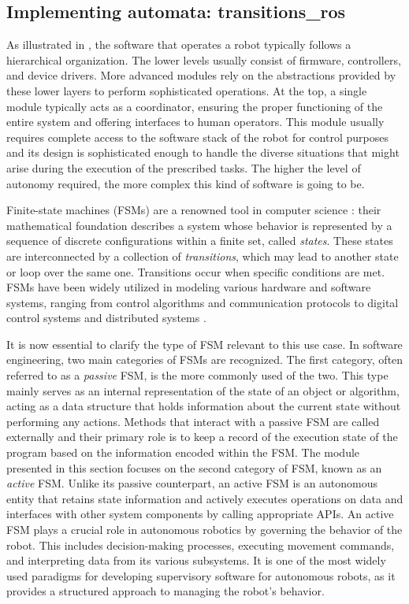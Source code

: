 \subsection{Implementing \ROS automata: transitions\_ros}
\label{sec:transitions_ros}
As illustrated in , the software that operates a robot typically follows a hierarchical organization. The lower levels usually consist of firmware, controllers, and device drivers. More advanced modules rely on the abstractions provided by these lower layers to perform sophisticated operations. At the top, a single module typically acts as a coordinator, ensuring the proper functioning of the entire system and offering interfaces to human operators. This module usually requires complete access to the software stack of the robot for control purposes and its design is sophisticated enough to handle the diverse situations that might arise during the execution of the prescribed tasks. The higher the level of autonomy required, the more complex this kind of software is going to be.

Finite-state machines (FSMs) are a renowned tool in computer science \cite{wagner_modeling_2006}: their mathematical foundation describes a system whose behavior is represented by a sequence of discrete configurations within a finite set, called \emph{states}. These states are interconnected by a collection of \emph{transitions}, which may lead to another state or loop over the same one. Transitions occur when specific conditions are met. FSMs have been widely utilized in modeling various hardware and software systems, ranging from control algorithms \cite{kalman_topics_1969} and communication protocols \cite{brand_communicating_1983} to digital control systems \cite{sklyarov_hierarchical_1999, pola_symbolic_2016} and distributed systems \cite{schneider_implementing_1990}.

It is now essential to clarify the type of FSM relevant to this use case. In software engineering, two main categories of FSMs are recognized. The first category, often referred to as a \emph{passive} FSM, is the more commonly used of the two. This type mainly serves as an internal representation of the state of an object or algorithm, acting as a data structure that holds information about the current state without performing any actions. Methods that interact with a passive FSM are called externally and their primary role is to keep a record of the execution state of the program based on the information encoded within the FSM. The module presented in this section focuses on the second category of FSM, known as an \emph{active} FSM. Unlike its passive counterpart, an active FSM is an autonomous entity that retains state information and actively executes operations on data and interfaces with other system components by calling appropriate APIs. An active FSM plays a crucial role in autonomous robotics by governing the behavior of the robot. This includes decision-making processes, executing movement commands, and interpreting data from its various subsystems. It is one of the most widely used paradigms for developing supervisory software for autonomous robots, as it provides a structured approach to managing the robot's behavior.

